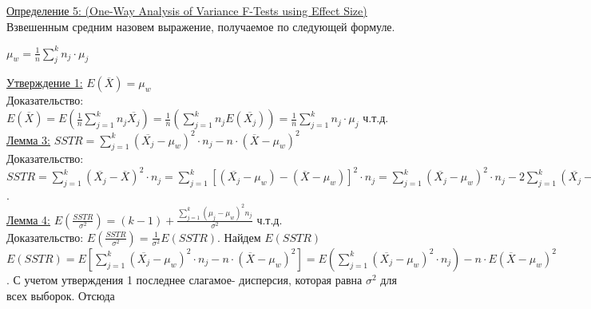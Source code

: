 \documentclass[a4paper]{article}
\begin{document}
\underline{Определение 5: (One-Way Analysis of Variance F-Tests using Effect Size)} Взвешенным средним назовем выражение, получаемое по следующей формуле.
\begin{center}
    $\mu_w = \frac{1}{n}\sum\limits_{j}^{k}n_j\cdot\mu_j$
\end{center}
\underline{Утверждение 1:} $E(\overline{X}) = \mu_w$\\
Доказательство: $E(\overline{X}) = E(\frac{1}{n}\sum\limits_{j = 1}^{k}n_j\overline{X_j}) = \frac{1}{n}(\sum\limits_{j = 1}^{k}n_jE(\overline{X_j})) = \frac{1}{n}\sum\limits_{j = 1}^{k}n_j\cdot\mu_j$ ч.т.д.\\
\underline{Лемма 3:} $SSTR = \sum\limits_{j = 1}^{k}(\overline{X_j} - \mu_w)^2\cdot n_j - n\cdot(\overline{X} - \mu_w)^2$\\
Доказательство: $SSTR = \sum\limits_{j = 1}^{k}(\overline{X_j} - \overline{X})^2\cdot n_j = \sum\limits_{j = 1}^{k}[(\overline{X_j} - \mu_w) - (\overline{X} - \mu_w)]^2\cdot n_j = \sum\limits_{j = 1}^{k}(\overline{X_j} - \mu_w)^2\cdot n_j - 2\sum\limits_{j = 1}^{k}(\overline{X_j} - \mu_w)(\overline{X} - \mu_w)\cdot n_j +  \sum\limits_{j = 1}^{k}(\overline{X} - \mu_w)^2\cdot n_j = \sum\limits_{j = 1}^{k}(\overline{X_j} - \mu_w)^2\cdot n_j - 2\cdot(\overline{X} - \mu_w)\sum\limits_{j = 1}^{k}(\overline{X_j} - \mu_w)\cdot n_j + (\overline{X} - \mu_w)^2\sum\limits_{j = 1}^{k}n_j = \sum\limits_{j = 1}^{k}(\overline{X_j} - \mu_w)^2\cdot n_j - 2\cdot(\overline{X} - \mu_w)[\sum\limits_{j = 1}^{k}\overline{X_j}\cdot n_j - \sum\limits_{j = 1}^{k}\mu_w\cdot n_j] + (\overline{X} - \mu_w)^2\cdot n = \sum\limits_{j = 1}^{k}(\overline{X_j} - \mu_w)^2\cdot n_j - 2\cdot(\overline{X} - \mu_w)(\overline{X} - \mu_w)\cdot n + (\overline{X} - \mu_w)^2\cdot n = \sum\limits_{j = 1}^{k}(\overline{X_j} - \mu_w)^2\cdot n_j - 2\cdot(\overline{X} - \mu_w)^2\cdot n + (\overline{X} - \mu_w)^2\cdot n = \sum\limits_{j = 1}^{k}(\overline{X_j} - \mu_w)^2\cdot n_j - n\cdot(\overline{X} - \mu_w)^2$.\\
\underline{Лемма 4:} $E(\frac{SSTR}{\sigma^2}) = (k - 1) + \frac{\sum\limits_{j = 1}^{k}(\mu_j - \mu_w)^2 n_j}{\sigma^2}$ ч.т.д.\\
Доказательство: $E(\frac{SSTR}{\sigma^2}) = \frac{1}{\sigma^2}E(SSTR)$. Найдем $E(SSTR)$\\
$E(SSTR) = E[\sum\limits_{j = 1}^{k}(\overline{X_j} - \mu_w)^2\cdot n_j - n\cdot(\overline{X} - \mu_w)^2] = E(\sum\limits_{j = 1}^{k}(\overline{X_j} - \mu_w)^2\cdot n_j) - n\cdot E(\overline{X} - \mu_w)^2$. С учетом утверждения 1 последнее слагамое- дисперсия, которая равна $\sigma^2$ для всех выборок. Отсюда\\
\end{document}
